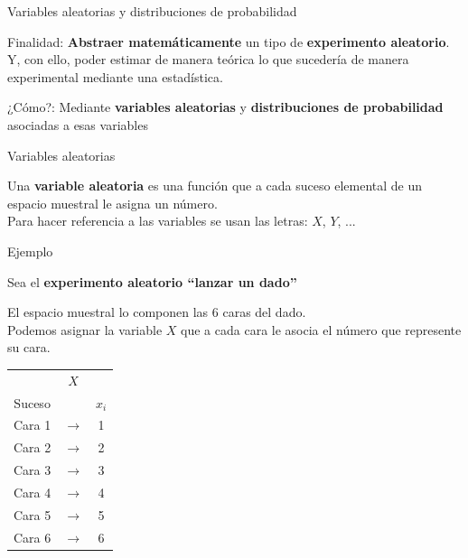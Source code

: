 \documentclass[11pt,handout]{beamer}
\begin{document}
\begin{frame}{Variables aleatorias y distribuciones de probabilidad}
\begin{block}{Finalidad:} \textbf{Abstraer matemáticamente} un tipo de \textbf{experimento aleatorio}. Y, con ello, poder estimar de manera teórica lo que sucedería de manera experimental mediante una estadística.
\end{block}

\pause

\begin{block}{¿Cómo?:} Mediante \textbf{variables aleatorias} y \textbf{distribuciones de probabilidad} asociadas a esas variables

\end{block}


\end{frame}

\begin{frame}{Variables aleatorias}
\begin{block}{}
Una \textbf{variable aleatoria} es una función que a cada suceso
elemental de un espacio muestral le asigna un número. \\ Para hacer referencia a las variables se usan las letras: $X$, $Y$, ...
\end{block}
\end{frame}

\begin{frame}{Ejemplo}
\begin{block}{}
Sea el \textbf{experimento aleatorio “lanzar un dado”} 
\end{block}
\pause
El espacio muestral lo componen las 6 caras del dado.\\
Podemos asignar la variable $X$ que a cada cara le asocia el número que represente su cara.
\begin{center}
\begin{tabular}{ccc}
 & $X$ &  \\
Suceso &  &  $x_i$\\ \hline 
Cara 1 & $\rightarrow$ & 1 \\ 
Cara 2 & $\rightarrow$ & 2 \\ 
Cara 3 & $\rightarrow$ & 3 \\ 
Cara 4 & $\rightarrow$ & 4 \\ 
Cara 5 & $\rightarrow$ & 5 \\ 
Cara 6 & $\rightarrow$ & 6 \\ 
\end{tabular} 
\end{center}
\end{frame}
\end{document}
